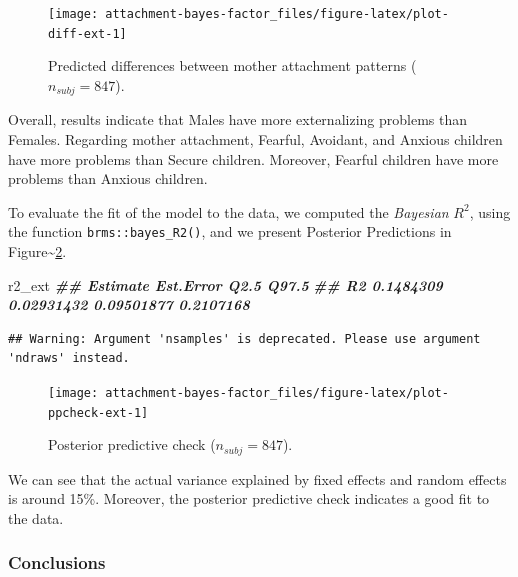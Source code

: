 \documentclass[
]{book}
\newenvironment{Shaded}{\begin{snugshade}}{\end{snugshade}}
\newcommand{\DocumentationTok}[1]{\textcolor[rgb]{0.56,0.35,0.01}{\textbf{\textit{#1}}}}
\newcommand{\NormalTok}[1]{#1}
\begin{document}
\begin{figure}

{\centering \texttt{[image: attachment-bayes-factor\_files/figure-latex/plot-diff-ext-1]} 

}

\caption{Predicted differences between mother attachment patterns ($n_{subj} = 847$).}\label{fig:plot-diff-ext}
\end{figure}

Overall, results indicate that Males have more externalizing problems than Females. Regarding mother attachment, Fearful, Avoidant, and Anxious children have more problems than Secure children. Moreover, Fearful children have more problems than Anxious children.

To evaluate the fit of the model to the data, we computed the \emph{Bayesian} \(R^2\), using the function \texttt{brms::bayes\_R2()}, and we present Posterior Predictions in Figure\textasciitilde\ref{fig:plot-ppcheck-ext}.

\begin{Shaded}
\begin{Highlighting}[]
\NormalTok{r2\_ext}
\DocumentationTok{\#\#     Estimate  Est.Error       Q2.5     Q97.5}
\DocumentationTok{\#\# R2 0.1484309 0.02931432 0.09501877 0.2107168}
\end{Highlighting}
\end{Shaded}

\begin{verbatim}
## Warning: Argument 'nsamples' is deprecated. Please use argument 'ndraws' instead.
\end{verbatim}

\begin{figure}

{\centering \texttt{[image: attachment-bayes-factor\_files/figure-latex/plot-ppcheck-ext-1]} 

}

\caption{Posterior predictive check ($n_{subj} = 847$).}\label{fig:plot-ppcheck-ext}
\end{figure}

We can see that the actual variance explained by fixed effects and random effects is around 15\%. Moreover, the posterior predictive check indicates a good fit to the data.

\hypertarget{conclusions-2}{%
\subsubsection*{Conclusions}\label{conclusions-2}}
\end{document}
